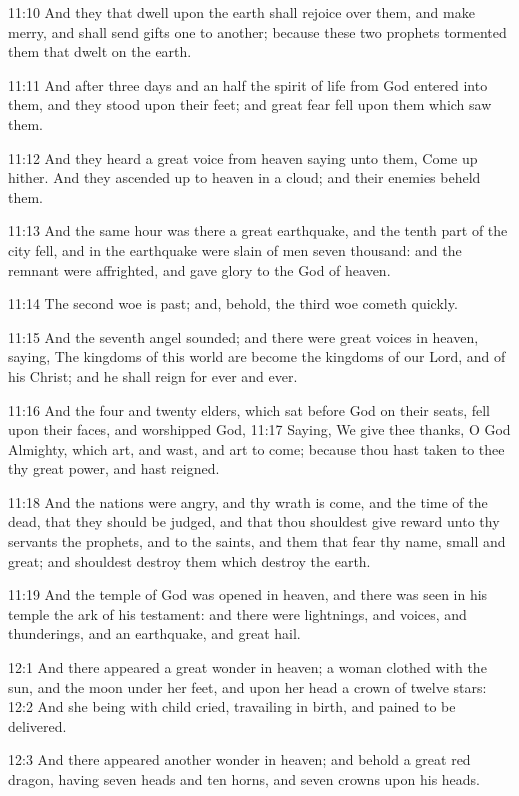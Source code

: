 11:10 And they that dwell upon the earth shall rejoice over them, and
make merry, and shall send gifts one to another; because these two
prophets tormented them that dwelt on the earth.

11:11 And after three days and an half the spirit of life from God
entered into them, and they stood upon their feet; and great fear fell
upon them which saw them.

11:12 And they heard a great voice from heaven saying unto them, Come
up hither. And they ascended up to heaven in a cloud; and their
enemies beheld them.

11:13 And the same hour was there a great earthquake, and the tenth
part of the city fell, and in the earthquake were slain of men seven
thousand: and the remnant were affrighted, and gave glory to the God
of heaven.

11:14 The second woe is past; and, behold, the third woe cometh
quickly.

11:15 And the seventh angel sounded; and there were great voices in
heaven, saying, The kingdoms of this world are become the kingdoms of
our Lord, and of his Christ; and he shall reign for ever and ever.

11:16 And the four and twenty elders, which sat before God on their
seats, fell upon their faces, and worshipped God, 11:17 Saying, We
give thee thanks, O \LORD God Almighty, which art, and wast, and art to
come; because thou hast taken to thee thy great power, and hast
reigned.

11:18 And the nations were angry, and thy wrath is come, and the time
of the dead, that they should be judged, and that thou shouldest give
reward unto thy servants the prophets, and to the saints, and them
that fear thy name, small and great; and shouldest destroy them which
destroy the earth.

11:19 And the temple of God was opened in heaven, and there was seen
in his temple the ark of his testament: and there were lightnings, and
voices, and thunderings, and an earthquake, and great hail.

12:1 And there appeared a great wonder in heaven; a woman clothed with
the sun, and the moon under her feet, and upon her head a crown of
twelve stars: 12:2 And she being with child cried, travailing in
birth, and pained to be delivered.

12:3 And there appeared another wonder in heaven; and behold a great
red dragon, having seven heads and ten horns, and seven crowns upon
his heads.


